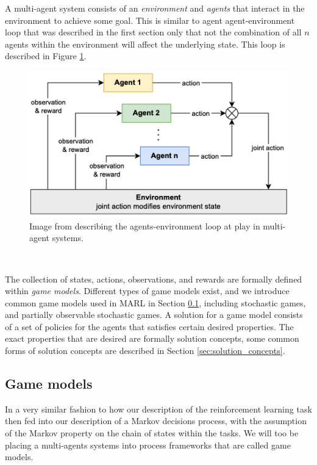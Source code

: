 \documentclass{article}
\begin{document}
A multi-agent system consists of an \textit{environment} and \textit{agents} that interact in the environment to achieve some goal. This is similar to agent agent-environment loop that was described in the first section only that not the combination of all $n$ agents within the environment will affect the underlying state. This loop is described in Figure \ref{fig:agents_environment_loop}. 

\begin{figure}
	\centering
	\includegraphics[scale=0.6]{images/multiple_agent_environment.png}
	\caption{Image from \citet{albrecht2024marl} describing the agents-environment loop at play in multi-agent systems.}
	\label{fig:agents_environment_loop}
\end{figure}

\

The collection of states, actions, observations, and rewards are formally defined within \textit{game models}. Different types of game models exist, and we introduce common game models used in MARL in Section \ref{sec:game_models}, including  stochastic games, and partially observable stochastic games. A solution for a game model consists of a set of policies for the agents that satisfies certain desired properties. The exact properties that are desired are formally solution concepts, some common forms of solution concepts are described in Section \ref{sec:solution_concepts}.

\subsection{Game models}\label{sec:game_models}

In a very similar fashion to how our description of the reinforcement learning task then fed into our description of a Markov decisions process, with the assumption of the Markov property on the chain of states within the tasks. We will too be placing a multi-agents systems into process frameworks that are called game models. 
\end{document}
